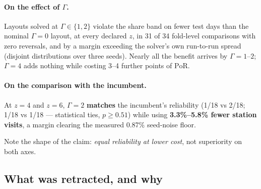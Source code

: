 \documentclass[11pt,a4paper]{article}
\newcommand{\PoR}{\mathrm{PoR}}
\begin{document}
\paragraph{On the effect of $\Gamma$.}
Layouts solved at $\Gamma\in\{1,2\}$ violate the share band on fewer test days
than the nominal $\Gamma=0$ layout, at every declared $z$, in 31 of 34
fold-level comparisons with zero reversals, and by a margin exceeding the
solver's own run-to-run spread (disjoint distributions over three seeds).
Nearly all the benefit arrives by $\Gamma=1$--$2$; $\Gamma=4$ adds nothing while
costing 3--4 further points of $\PoR$.

\paragraph{On the comparison with the incumbent.}
At $z=4$ and $z=6$, $\Gamma=2$ \textbf{matches} the incumbent's reliability
(1/18 vs 2/18; 1/18 vs 1/18 --- statistical ties, $p\ge0.51$) while using
\textbf{3.3\%--5.8\% fewer station visits}, a margin clearing the measured
0.87\% seed-noise floor.

Note the shape of the claim: \emph{equal reliability at lower cost}, not
superiority on both axes.

\subsection{What was retracted, and why}
\end{document}
